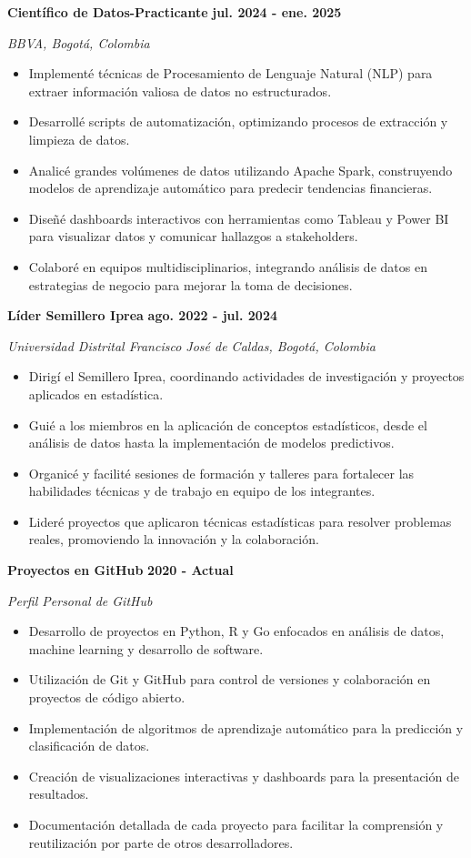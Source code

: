 \documentclass[paper=a4,fontsize=11pt]{scrartcl} %
\newcommand{\sepspace}{\vspace*{0.8em}}
\newcommand{\WorkEntry}[4]{%
  \noindent \textbf{#1} \hfill \textbf{#2} \par
  \noindent \textit{#3} \par
  \noindent \small #4 
  \normalsize \par \sepspace
}
\begin{document}
\WorkEntry{Científico de Datos-Practicante}{jul. 2024 - ene. 2025}{BBVA, Bogotá, Colombia}{%
\begin{itemize}[leftmargin=*, noitemsep]
    \item Implementé técnicas de Procesamiento de Lenguaje Natural (NLP) para extraer información valiosa de datos no estructurados.
    \item Desarrollé scripts de automatización, optimizando procesos de extracción y limpieza de datos.
    \item Analicé grandes volúmenes de datos utilizando Apache Spark, construyendo modelos de aprendizaje automático para predecir tendencias financieras.
    \item Diseñé dashboards interactivos con herramientas como Tableau y Power BI para visualizar datos y comunicar hallazgos a stakeholders.
    \item Colaboré en equipos multidisciplinarios, integrando análisis de datos en estrategias de negocio para mejorar la toma de decisiones.
\end{itemize}
}

\WorkEntry{Líder Semillero Iprea}{ago. 2022 - jul. 2024}{Universidad Distrital Francisco José de Caldas, Bogotá, Colombia}{%
\begin{itemize}[leftmargin=*, noitemsep]
    \item Dirigí el Semillero Iprea, coordinando actividades de investigación y proyectos aplicados en estadística.
    \item Guié a los miembros en la aplicación de conceptos estadísticos, desde el análisis de datos hasta la implementación de modelos predictivos.
    \item Organicé y facilité sesiones de formación y talleres para fortalecer las habilidades técnicas y de trabajo en equipo de los integrantes.
    \item Lideré proyectos que aplicaron técnicas estadísticas para resolver problemas reales, promoviendo la innovación y la colaboración.
\end{itemize}
}

\WorkEntry{Proyectos en GitHub}{2020 - Actual}{Perfil Personal de GitHub}{%
\begin{itemize}[leftmargin=*, noitemsep]
    \item Desarrollo de proyectos en Python, R y Go enfocados en análisis de datos, machine learning y desarrollo de software.
    \item Utilización de Git y GitHub para control de versiones y colaboración en proyectos de código abierto.
    \item Implementación de algoritmos de aprendizaje automático para la predicción y clasificación de datos.
    \item Creación de visualizaciones interactivas y dashboards para la presentación de resultados.
    \item Documentación detallada de cada proyecto para facilitar la comprensión y reutilización por parte de otros desarrolladores.
\end{itemize}
}
\end{document}
